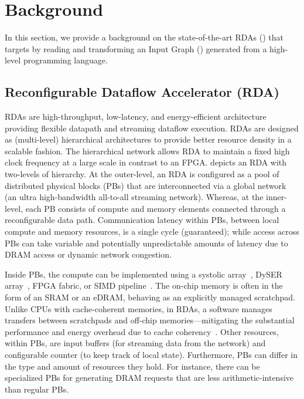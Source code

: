 \section{Background}
\label{sec:background}

In this section, we provide a background on the state-of-the-art RDAs () that \name{} targets by reading and transforming an Input Graph () generated from a high-level programming language.

\subsection{Reconfigurable Dataflow Accelerator (RDA)} 
\label{ssec:rda}

RDAs are high-throughput, low-latency, and energy-efficient architecture providing flexible datapath
and streaming dataflow execution.
RDAs are designed as (multi-level) hierarchical architectures to provide better resource density in a scalable fashion. 
The hierarchical network allows RDA to maintain a fixed high clock frequency at a large scale in contrast to an FPGA.
 depicts an RDA with two-levels of hierarchy.
At the outer-level, an RDA is configured as a pool of distributed physical blocks (PBs) that are interconnected via a global network (an ultra high-bandwidth all-to-all streaming network).
Whereas, at the inner-level, each PB consists of compute and memory elements connected through a reconfigurable data path.
Communication latency within PBs, between local compute and memory resources, is a single cycle (guaranteed); 
while access across PBs can take variable and potentially unpredictable amounts of latency due to DRAM access or dynamic network congestion.

Inside PBs, the compute can be implemented using a systolic array~\cite{DaDianNao}, DySER array~\cite{dyser}, FPGA fabric, or SIMD pipeline~\cite{plasticine}.
The on-chip memory is often in the form of an SRAM or an eDRAM, behaving as an explicitly managed scratchpad.
Unlike CPUs with cache-coherent memories, in RDAs, a software manages transfers between scratchpads and off-chip memories---mitigating the substantial performance and energy 
overhead due to cache coherency~\cite{mark}.
Other resources, within PBs, are input buffers (for streaming data from the network) and configurable counter (to keep track of local state).
Furthermore, PBs can differ in the type and amount of resources they hold. 
For instance, there can be specialized PBs for generating DRAM requests that are less arithmetic-intensive than regular PBs.

